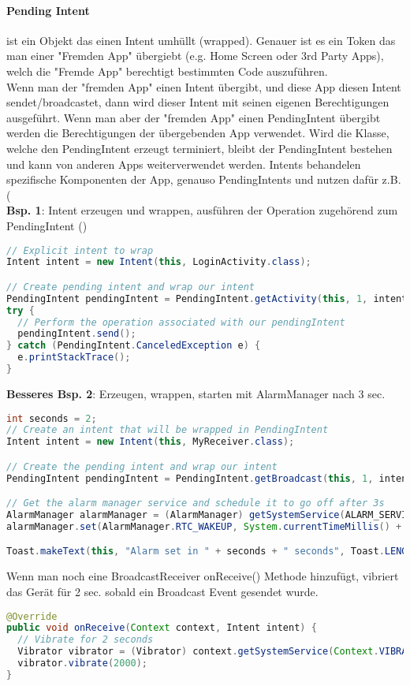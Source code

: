 \paragraph{Pending Intent} ist ein Objekt das einen Intent umhüllt (wrapped). Genauer ist es ein Token das man einer "{}Fremden App"{} übergiebt (e.g.  Home Screen  oder 3rd Party Apps), welch die "Fremde App" berechtigt bestimmten Code auszuführen. \\
Wenn man der "{}fremden App"{} einen Intent übergibt, und diese App diesen Intent sendet/broadcastet, dann wird dieser Intent mit seinen eigenen Berechtigungen ausgeführt. Wenn man aber der "fremden App" einen PendingIntent übergibt werden die Berechtigungen der übergebenden App verwendet. Wird die Klasse, welche den PendingIntent erzeugt terminiert, bleibt der PendingIntent bestehen und kann von anderen Apps weiterverwendet werden. Intents behandelen spezifische Komponenten der App, genauso PendingIntents und nutzen dafür z.B. ( \\
\textbf{Bsp. 1}: Intent erzeugen und wrappen, ausführen der Operation zugehörend zum PendingIntent ()
\begin{lstlisting}[language=java]
// Explicit intent to wrap
Intent intent = new Intent(this, LoginActivity.class);

// Create pending intent and wrap our intent
PendingIntent pendingIntent = PendingIntent.getActivity(this, 1, intent, PendingIntent.FLAG_CANCEL_CURRENT);
try {
  // Perform the operation associated with our pendingIntent
  pendingIntent.send();
} catch (PendingIntent.CanceledException e) {
  e.printStackTrace();
}
\end{lstlisting}
\textbf{Besseres Bsp. 2}: Erzeugen, wrappen, starten mit AlarmManager nach 3 sec.
\begin{lstlisting}[language=java]
int seconds = 2;
// Create an intent that will be wrapped in PendingIntent
Intent intent = new Intent(this, MyReceiver.class);

// Create the pending intent and wrap our intent
PendingIntent pendingIntent = PendingIntent.getBroadcast(this, 1, intent, 0);

// Get the alarm manager service and schedule it to go off after 3s
AlarmManager alarmManager = (AlarmManager) getSystemService(ALARM_SERVICE);
alarmManager.set(AlarmManager.RTC_WAKEUP, System.currentTimeMillis() + (seconds * 1000), pendingIntent);

Toast.makeText(this, "Alarm set in " + seconds + " seconds", Toast.LENGTH_LONG).show();
\end{lstlisting}
Wenn man noch eine BroadcastReceiver onReceive() Methode hinzufügt, vibriert das Gerät für 2 sec. sobald ein Broadcast Event gesendet wurde.
\begin{lstlisting}[language=java]
@Override
public void onReceive(Context context, Intent intent) {
  // Vibrate for 2 seconds
  Vibrator vibrator = (Vibrator) context.getSystemService(Context.VIBRATOR_SERVICE);
  vibrator.vibrate(2000);
}
\end{lstlisting}
